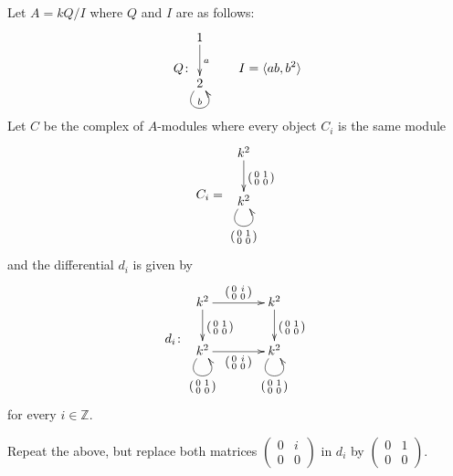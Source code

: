 \documentclass[a4paper]{amsart}
\newcommand{\Z}{\mathbb{Z}}
\begin{document}
\begin{Exercise}[title={Chain complexes}]
\Question Let $A = kQ/I$ where $Q$ and $I$ are as follows:
\[
Q\colon
\vcenter{\xymatrix{
1 \ar[d]^a \\
2 \ar@(dl,dr)^b
}}
\qquad
I = \langle ab, b^2 \rangle
\]
Let $C$ be the complex of $A$-modules where every object $C_i$ is the
same module
\[
C_i =
\vcenter{\xymatrix{
k^2 \ar[d]^{\left( \begin{smallmatrix} 0&1 \\ 0&0 \end{smallmatrix} \right)} \\
k^2 \ar@(dl,dr)_{\left( \begin{smallmatrix} 0&1 \\ 0&0 \end{smallmatrix} \right)}
}}
\]
and the differential $d_i$ is given by
\[
d_i \colon
\vcenter{\xymatrix@C=4em{
k^2 \ar[d]^{\left( \begin{smallmatrix} 0&1 \\ 0&0 \end{smallmatrix} \right)}
    \ar[r]^{\left( \begin{smallmatrix} 0&i \\ 0&0 \end{smallmatrix} \right)} &
k^2 \ar[d]^{\left( \begin{smallmatrix} 0&1 \\ 0&0 \end{smallmatrix} \right)} \\
k^2 \ar@(dl,dr)_{\left( \begin{smallmatrix} 0&1 \\ 0&0 \end{smallmatrix} \right)}
    \ar[r]_{\left( \begin{smallmatrix} 0&i \\ 0&0 \end{smallmatrix} \right)} &
k^2 \ar@(dl,dr)_{\left( \begin{smallmatrix} 0&1 \\ 0&0 \end{smallmatrix} \right)}
}}
\]
for every $i \in \Z$.

\Question Repeat the above, but replace both matrices
$\left( \begin{smallmatrix} 0&i \\ 0&0 \end{smallmatrix} \right)$
in $d_i$ by
$\left( \begin{smallmatrix} 0&1 \\ 0&0 \end{smallmatrix} \right)$.
\end{Exercise}
\end{document}
